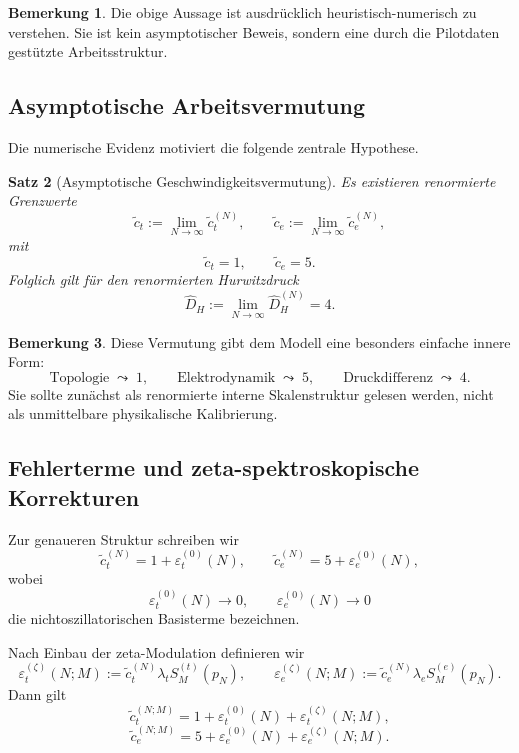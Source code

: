 \documentclass[12pt,a4paper]{article}
\newtheorem{satz}{Satz}[section]
\theoremstyle{definition}
\newtheorem{bemerkung}[satz]{Bemerkung}
\begin{document}
	\begin{bemerkung}
		Die obige Aussage ist ausdrücklich heuristisch-numerisch zu verstehen. Sie ist kein asymptotischer Beweis, sondern eine durch die Pilotdaten gestützte Arbeitsstruktur.
	\end{bemerkung}
	
	\subsection{Asymptotische Arbeitsvermutung}
	
	Die numerische Evidenz motiviert die folgende zentrale Hypothese.
	
	\begin{satz}[Asymptotische Geschwindigkeitsvermutung]
		Es existieren renormierte Grenzwerte
		\[
		\tilde c_t:=\lim_{N\to\infty}\tilde c_t^{(N)},
		\qquad
		\tilde c_e:=\lim_{N\to\infty}\tilde c_e^{(N)},
		\]
		mit
		\[
		\tilde c_t=1,
		\qquad
		\tilde c_e=5.
		\]
		Folglich gilt für den renormierten Hurwitzdruck
		\[
		\widehat D_H:=\lim_{N\to\infty}\widehat D_H^{(N)}=4.
		\]
	\end{satz}
	
	\begin{bemerkung}
		Diese Vermutung gibt dem Modell eine besonders einfache innere Form:
		\[
		\text{Topologie} \;\leadsto\; 1,
		\qquad
		\text{Elektrodynamik} \;\leadsto\; 5,
		\qquad
		\text{Druckdifferenz} \;\leadsto\; 4.
		\]
		Sie sollte zunächst als renormierte interne Skalenstruktur gelesen werden, nicht als unmittelbare physikalische Kalibrierung.
	\end{bemerkung}
	
	\subsection{Fehlerterme und zeta-spektroskopische Korrekturen}
	
	Zur genaueren Struktur schreiben wir
	\[
	\tilde c_t^{(N)}=1+\varepsilon_t^{(0)}(N),
	\qquad
	\tilde c_e^{(N)}=5+\varepsilon_e^{(0)}(N),
	\]
	wobei
	\[
	\varepsilon_t^{(0)}(N)\to 0,
	\qquad
	\varepsilon_e^{(0)}(N)\to 0
	\]
	die nichtoszillatorischen Basisterme bezeichnen.
	
	Nach Einbau der zeta-Modulation definieren wir
	\[
	\varepsilon_t^{(\zeta)}(N;M)
	:=
	\tilde c_t^{(N)}\lambda_t S_M^{(t)}(p_N),
	\qquad
	\varepsilon_e^{(\zeta)}(N;M)
	:=
	\tilde c_e^{(N)}\lambda_e S_M^{(e)}(p_N).
	\]
	Dann gilt
	\[
	\tilde c_t^{(N;M)}
	=
	1+\varepsilon_t^{(0)}(N)+\varepsilon_t^{(\zeta)}(N;M),
	\]
	\[
	\tilde c_e^{(N;M)}
	=
	5+\varepsilon_e^{(0)}(N)+\varepsilon_e^{(\zeta)}(N;M).
	\]
	
\end{document}
